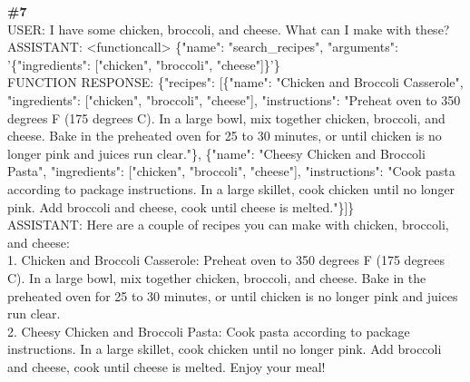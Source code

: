 \documentclass[10pt]{article}
\begin{document}
\begin{Form}
\CheckBox[name=q6c,width=1.6ex,height=1.6ex,bordercolor={0.45 0.45 0.45}]{~\textcolor{cbox}{COMPACT}}\quad
\CheckBox[name=q6d,width=1.6ex,height=1.6ex,bordercolor={0.45 0.45 0.45}]{~\textcolor{dbox}{DIFFUSE}}\quad
\CheckBox[name=q6n,width=1.6ex,height=1.6ex,bordercolor={0.45 0.45 0.45}]{~\textcolor{nbox}{NONE}}
\vspace{8pt}
\begin{tcolorbox}[colback=convbg,colframe=itemframe,boxrule=0.8pt,arc=2pt,breakable,left=6pt,right=6pt,top=5pt,bottom=5pt]
{\footnotesize\textbf{\#7}}\\[3pt]
{\footnotesize USER: I have some chicken, broccoli, and cheese. What can I make with these? \\[2pt]
ASSISTANT: <functioncall> \{"name": "search\_recipes", "arguments": '\{"ingredients": ["chicken", "broccoli", "cheese"]\}'\}   \\[2pt]
FUNCTION RESPONSE: \{"recipes": [\{"name": "Chicken and Broccoli Casserole", "ingredients": ["chicken", "broccoli", "cheese"], "instructions": "Preheat oven to 350 degrees F (175 degrees C). In a large bowl, mix together chicken, broccoli, and cheese. Bake in the preheated oven for 25 to 30 minutes, or until chicken is no longer pink and juices run clear."\}, \{"name": "Cheesy Chicken and Broccoli Pasta", "ingredients": ["chicken", "broccoli", "cheese"], "instructions": "Cook pasta according to package instructions. In a large skillet, cook chicken until no longer pink. Add broccoli and cheese, cook until cheese is melted."\}]\} \\[2pt]
ASSISTANT: Here are a couple of recipes you can make with chicken, broccoli, and cheese: \\[2pt]
1. Chicken and Broccoli Casserole: Preheat oven to 350 degrees F (175 degrees C). In a large bowl, mix together chicken, broccoli, and cheese. Bake in the preheated oven for 25 to 30 minutes, or until chicken is no longer pink and juices run clear. \\[2pt]
2. Cheesy Chicken and Broccoli Pasta: Cook pasta according to package instructions. In a large skillet, cook chicken until no longer pink. Add broccoli and cheese, cook until cheese is melted. Enjoy your meal!  }
\end{tcolorbox}
\vspace{-1pt}
\CheckBox[name=q7c,width=1.6ex,height=1.6ex,bordercolor={0.45 0.45 0.45}]{~\textcolor{cbox}{COMPACT}}\quad
\CheckBox[name=q7d,width=1.6ex,height=1.6ex,bordercolor={0.45 0.45 0.45}]{~\textcolor{dbox}{DIFFUSE}}\quad
\CheckBox[name=q7n,width=1.6ex,height=1.6ex,bordercolor={0.45 0.45 0.45}]{~\textcolor{nbox}{NONE}}

\end{Form}
\end{document}
